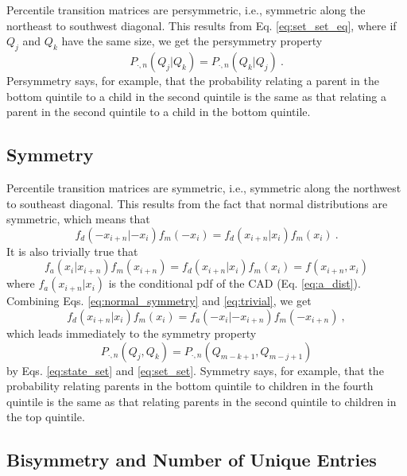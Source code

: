 \documentclass{svproc} %
\begin{document}
Percentile transition matrices are persymmetric, i.e., symmetric along the northeast to southwest diagonal. This results from Eq. \ref{eq:set_set_eq}, where if $Q_j$ and $Q_k$ have the same size, we get the persymmetry property
\begin{equation}
P_{ \cdot, n}(Q_j | Q_k) = P_{\cdot, n}(Q_k | Q_j) \ .
\label{eq:persymmetry}
\end{equation}
Persymmetry says, for example, that the probability relating a parent in the bottom quintile to a child in the second quintile is the same as that relating a parent in the second quintile to a child in the bottom quintile.


\subsection{Symmetry}

Percentile transition matrices are symmetric, i.e., symmetric along the northwest to southeast diagonal. This results from the fact that normal distributions are symmetric, which means that 
\begin{equation}
f_d(-x_{i+n} | -x_i) f_m(-x_i) = f_d(x_{i+n} | x_i) f_m(x_i) \ .
\label{eq:normal_symmetry}
\end{equation} 
It is also trivially true that 
\begin{equation}
f_a(x_i | x_{i+n}) f_m(x_{i+n}) = f_d(x_{i+n} | x_i) f_m(x_i) = f(x_{i+n} , x_i)
\label{eq:trivial}
\end{equation}
where $f_a(x_{i+n}|x_i)$ is the conditional pdf of the CAD (Eq. \ref{eq:a_dist}).
Combining Eqs. \ref{eq:normal_symmetry} and \ref{eq:trivial}, we get 
\begin{equation}
f_d(x_{i+n}|x_i)f_m(x_i) = f_a(-x_i|-x_{i+n})f_m(-x_{i+n}) \ , 
\end{equation} 
which leads immediately to the symmetry property 
\begin{equation}
P_{ \cdot, n}(Q_j, Q_k) = P_{\cdot, n}(Q_{m-k+1}, Q_{m-j+1}) 
\label{eq:symmetry}
\end{equation}
by Eqs. \ref{eq:state_set} and \ref{eq:set_set}.
Symmetry says, for example, that the probability relating parents in the bottom quintile to children in the fourth quintile is the same as that relating parents in the second quintile to children in the top quintile. 

\subsection{Bisymmetry and Number of Unique Entries} \label{bisymmetry}
\end{document}
